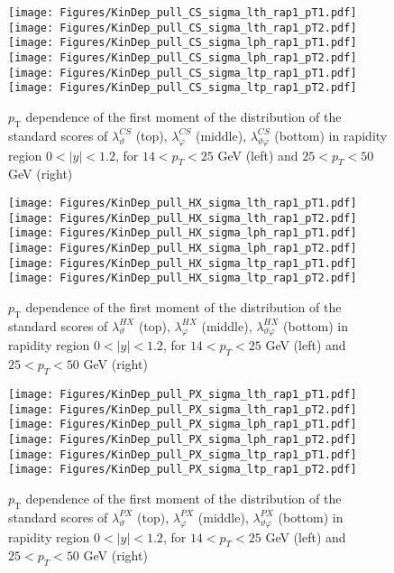 \documentclass[12pt]{article}
\newcommand{\pT}{p_\mathrm{T}}
\newcommand{\absy}{\left |  y \right |}
\newcommand{\lamthCS}{\lambda^{\scriptscriptstyle CS}_\vartheta}
\newcommand{\lamphCS}{\lambda^{\scriptscriptstyle CS}_\varphi}
\newcommand{\lamthphCS}{\lambda^{\scriptscriptstyle CS}_{\vartheta \varphi}}
\newcommand{\lamthHX}{\lambda^{\scriptscriptstyle HX}_\vartheta}
\newcommand{\lamphHX}{\lambda^{\scriptscriptstyle HX}_\varphi}
\newcommand{\lamthphHX}{\lambda^{\scriptscriptstyle HX}_{\vartheta \varphi}}
\newcommand{\lamthPX}{\lambda^{\scriptscriptstyle PX}_\vartheta}
\newcommand{\lamphPX}{\lambda^{\scriptscriptstyle PX}_\varphi}
\newcommand{\lamthphPX}{\lambda^{\scriptscriptstyle PX}_{\vartheta \varphi}}
\begin{document}
\begin{figure}[htbp]
\centering
\texttt{[image: Figures/KinDep\_pull\_CS\_sigma\_lth\_rap1\_pT1.pdf]}
\texttt{[image: Figures/KinDep\_pull\_CS\_sigma\_lth\_rap1\_pT2.pdf]}
\texttt{[image: Figures/KinDep\_pull\_CS\_sigma\_lph\_rap1\_pT1.pdf]}
\texttt{[image: Figures/KinDep\_pull\_CS\_sigma\_lph\_rap1\_pT2.pdf]}
\texttt{[image: Figures/KinDep\_pull\_CS\_sigma\_ltp\_rap1\_pT1.pdf]}
\texttt{[image: Figures/KinDep\_pull\_CS\_sigma\_ltp\_rap1\_pT2.pdf]}
\caption{$\pT$ dependence of the first moment of the distribution of the
standard scores of $\lamthCS$ (top), $\lamphCS$ (middle), $\lamthphCS$ (bottom)
in rapidity region $0<\absy<1.2$, for $14 < p_T < 25$ GeV (left) and
$25 < p_T < 50$ GeV (right)}
\end{figure}
\clearpage

\begin{figure}[htbp]
\centering
\texttt{[image: Figures/KinDep\_pull\_HX\_sigma\_lth\_rap1\_pT1.pdf]}
\texttt{[image: Figures/KinDep\_pull\_HX\_sigma\_lth\_rap1\_pT2.pdf]}
\texttt{[image: Figures/KinDep\_pull\_HX\_sigma\_lph\_rap1\_pT1.pdf]}
\texttt{[image: Figures/KinDep\_pull\_HX\_sigma\_lph\_rap1\_pT2.pdf]}
\texttt{[image: Figures/KinDep\_pull\_HX\_sigma\_ltp\_rap1\_pT1.pdf]}
\texttt{[image: Figures/KinDep\_pull\_HX\_sigma\_ltp\_rap1\_pT2.pdf]}
\caption{$\pT$ dependence of the first moment of the distribution of the
standard scores of $\lamthHX$ (top), $\lamphHX$ (middle), $\lamthphHX$ (bottom)
in rapidity region $0<\absy<1.2$, for $14 < p_T < 25$ GeV (left) and
$25 < p_T < 50$ GeV (right)}
\end{figure}
\clearpage

\begin{figure}[htbp]
\centering
\texttt{[image: Figures/KinDep\_pull\_PX\_sigma\_lth\_rap1\_pT1.pdf]}
\texttt{[image: Figures/KinDep\_pull\_PX\_sigma\_lth\_rap1\_pT2.pdf]}
\texttt{[image: Figures/KinDep\_pull\_PX\_sigma\_lph\_rap1\_pT1.pdf]}
\texttt{[image: Figures/KinDep\_pull\_PX\_sigma\_lph\_rap1\_pT2.pdf]}
\texttt{[image: Figures/KinDep\_pull\_PX\_sigma\_ltp\_rap1\_pT1.pdf]}
\texttt{[image: Figures/KinDep\_pull\_PX\_sigma\_ltp\_rap1\_pT2.pdf]}
\caption{$\pT$ dependence of the first moment of the distribution of the
standard scores of $\lamthPX$ (top), $\lamphPX$ (middle), $\lamthphPX$ (bottom)
in rapidity region $0<\absy<1.2$, for $14 < p_T < 25$ GeV (left) and
$25 < p_T < 50$ GeV (right)}
\end{figure}
\clearpage
\end{document}
